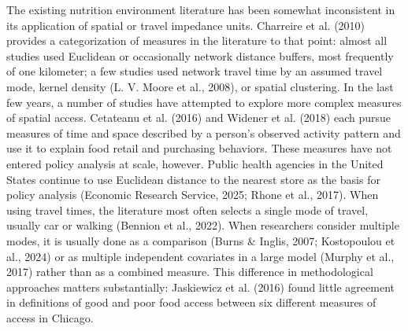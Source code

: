 \documentclass[
  letterpaper,
  number,
  review,
  3p]{elsarticle}
\begin{document}
The existing nutrition environment literature has been somewhat
inconsistent in its application of spatial or travel impedance units.
Charreire et al. (2010) provides a categorization of measures in the
literature to that point: almost all studies used Euclidean or
occasionally network distance buffers, most frequently of one kilometer;
a few studies used network travel time by an assumed travel mode, kernel
density (L. V. Moore et al., 2008), or spatial clustering. In the last
few years, a number of studies have attempted to explore more complex
measures of spatial access. Cetateanu et al. (2016) and Widener et al.
(2018) each pursue measures of time and space described by a person's
observed activity pattern and use it to explain food retail and
purchasing behaviors. These measures have not entered policy analysis at
scale, however. Public health agencies in the United States continue to
use Euclidean distance to the nearest store as the basis for policy
analysis (Economic Research Service, 2025; Rhone et al., 2017). When
using travel times, the literature most often selects a single mode of
travel, usually car or walking (Bennion et al., 2022). When researchers
consider multiple modes, it is usually done as a comparison (Burns \&
Inglis, 2007; Kostopoulou et al., 2024) or as multiple independent
covariates in a large model (Murphy et al., 2017) rather than as a
combined measure. This difference in methodological approaches matters
substantially: Jaskiewicz et al. (2016) found little agreement in
definitions of good and poor food access between six different measures
of access in Chicago.
\end{document}
